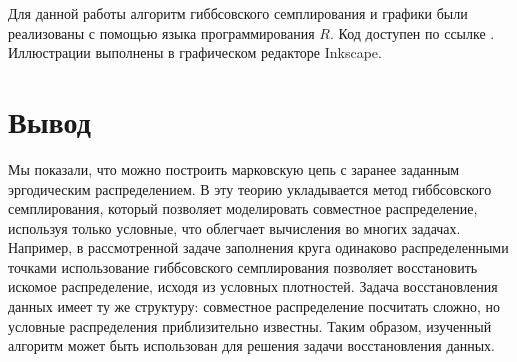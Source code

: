 \documentclass[14pt,a4paper]{article}
\begin{document}
Для данной работы алгоритм гиббсовского семплирования и графики были реализованы с помощью языка программирования $R$. Код доступен по ссылке \cite{code}. Иллюстрации выполнены в графическом редакторе Inkscape.
\newpage
\section*{Вывод}
Мы показали, что можно построить марковскую цепь с заранее заданным эргодическим распределением. В эту теорию укладывается метод гиббсовского семплирования, который позволяет моделировать совместное распределение, используя только условные, что облегчает вычисления во многих задачах. Например, в рассмотренной задаче заполнения круга одинаково распределенными точками использование гиббсовского семплирования позволяет восстановить искомое распределение, исходя из условных плотностей. Задача восстановления данных имеет ту же структуру: совместное распределение посчитать сложно, но условные распределения приблизительно известны. Таким образом, изученный алгоритм может быть использован для решения задачи восстановления данных.



\newpage
{}
\end{document}
